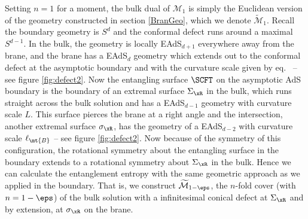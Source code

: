 %
%		
\begin{figure}[h]
	\def\svgwidth{0.6\linewidth}
\end{figure}

Setting $n=1$ for a moment, the bulk dual of $\mathcal{M}_{1}$ is simply the Euclidean version of the geometry constructed in section \ref{BranGeo}, which we denote $\widetilde{\mathcal{M}}_{1}$. Recall the boundary geometry is $S^{d}$ and the conformal defect runs around a maximal $S^{d-1}$. In the bulk, the geometry is locally EAdS$_{d+1}$ everywhere away from the brane, and the brane has a EAdS$_d$ geometry which extends out to the conformal defect at the asymptotic boundary and with the curvature scale given by eq.~ -- see figure \ref{fig:defect2}. Now the  entangling surface $\SCFT$ on the asymptotic AdS boundary is the boundary of an extremal surface $\Sigma_\xR$ in the bulk, which runs  straight across the bulk solution and has a EAdS$_{d-1}$ geometry with curvature scale $L$.  This surface pierces the brane at a right angle and the intersection, another extremal surface $\sigma_\xR$, has the geometry of a EAdS$_{d-2}$ with curvature scale $\ell_\mt{B}$ -- see figure \ref{fig:defect2}. Now because of the symmetry of this configuration, the rotational symmetry about the entangling surface in the boundary extends to a rotational symmetry about $\Sigma_\xR$ in the bulk. Hence we can calculate the entanglement entropy with the same geometric approach as we applied in the boundary. That is, we construct $\widetilde{\mathcal{M}}_{1-\eps}$, the $n$-fold cover (with $n=1-\eps$) of the bulk solution  with a infinitesimal conical defect at $\Sigma_\xR$ and by extension, at $\sigma_\xR$ on the brane. 

\begin{figure}[h]
	\def\svgwidth{0.6\linewidth}
\end{figure}

